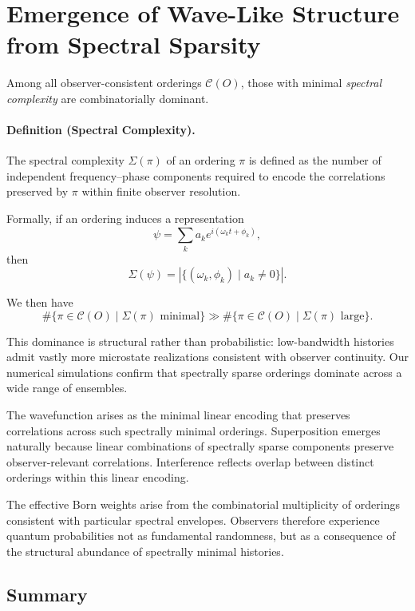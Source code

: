 \documentclass[11pt]{article}
\begin{document}
\section{Emergence of Wave-Like Structure from Spectral Sparsity}

Among all observer-consistent orderings \(\mathcal{C}(O)\), those with minimal
\emph{spectral complexity} are combinatorially dominant.

\paragraph{Definition (Spectral Complexity).}
The spectral complexity \(\Sigma(\pi)\) of an ordering \(\pi\) is defined as the number
of independent frequency--phase components required to encode the correlations preserved
by \(\pi\) within finite observer resolution.

Formally, if an ordering induces a representation
\[
\psi = \sum_k a_k e^{i(\omega_k t + \phi_k)},
\]
then
\[
\Sigma(\psi) = \left| \{ (\omega_k,\phi_k) \mid a_k \neq 0 \} \right|.
\]

We then have
\begin{equation}
\#\{\pi \in \mathcal{C}(O) \mid \Sigma(\pi) \text{ minimal}\}
\gg
\#\{\pi \in \mathcal{C}(O) \mid \Sigma(\pi) \text{ large}\}.
\end{equation}

This dominance is structural rather than probabilistic: low-bandwidth histories
admit vastly more microstate realizations consistent with observer continuity.
Our numerical simulations confirm that spectrally sparse orderings dominate across
a wide range of ensembles.

The wavefunction arises as the minimal linear encoding that preserves correlations
across such spectrally minimal orderings.
Superposition emerges naturally because linear combinations of spectrally sparse
components preserve observer-relevant correlations.
Interference reflects overlap between distinct orderings within this linear encoding.

The effective Born weights arise from the combinatorial multiplicity of orderings
consistent with particular spectral envelopes.
Observers therefore experience quantum probabilities not as fundamental randomness,
but as a consequence of the structural abundance of spectrally minimal histories.

\subsection{Summary}
\end{document}
